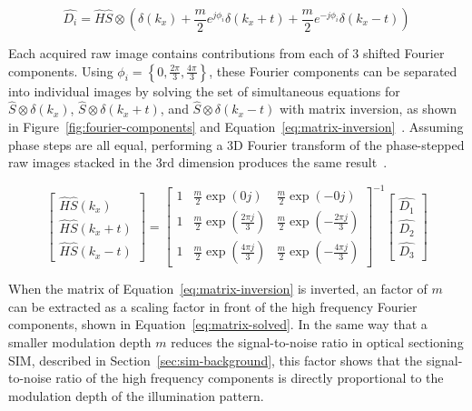\begin{equation} \label{eq:heintzmann-fourier}
\hat{D_i} = \hat{H} \hat{S} \otimes \left( \delta \left( k_x \right) + \frac{m}{2} e^{j\phi_i} \delta \left( k_x + t \right) + \frac{m}{2} e^{-j\phi_i} \delta \left( k_x - t \right) \right)
\end{equation}

Each acquired raw image contains contributions from each of 3 shifted Fourier components.
Using $\phi_i = \left\lbrace0, \frac{2\pi}{3}, \frac{4\pi}{3}\right\rbrace$, these Fourier components can be separated into individual images by solving the set of simultaneous equations for $\hat{S}\otimes\delta \left( k_x \right)$, $\hat{S}\otimes\delta \left( k_x + t \right)$, and $\hat{S}\otimes\delta \left( k_x - t \right)$ with matrix inversion, as shown in Figure~\ref{fig:fourier-components} and Equation~\ref{eq:matrix-inversion}~\cite{wicker2013phase}.
Assuming phase steps are all equal, performing a 3D Fourier transform of the phase-stepped raw images stacked in the 3rd dimension produces the same result~\cite{gustafsson2005nonlinear}.

\begin{equation} \label{eq:matrix-inversion}
\begin{bmatrix} \hat{H}\hat{S}\left(k_x\right) \\ \hat{H}\hat{S}\left(k_x+t\right) \\ \hat{H}\hat{S}\left(k_x-t\right) \end{bmatrix} =
\begin{bmatrix}
1 & \frac{m}{2}\exp\left(0j\right) & \frac{m}{2}\exp\left(-0j\right) \\
1 & \frac{m}{2}\exp\left(\frac{2\pi j}{3}\right) & \frac{m}{2}\exp\left(-\frac{2\pi j}{3}\right) \\
1 & \frac{m}{2}\exp\left(\frac{4\pi j}{3}\right) & \frac{m}{2}\exp\left(-\frac{4\pi j}{3}\right)
\end{bmatrix}^{-1}
\begin{bmatrix} \hat{D_1} \\ \hat{D_2} \\ \hat{D_3} \end{bmatrix}
\end{equation}

\newpage
When the matrix of Equation~\ref{eq:matrix-inversion} is inverted, an factor of $m$ can be extracted as a scaling factor in front of the high frequency Fourier components, shown in Equation~\ref{eq:matrix-solved}.
In the same way that a smaller modulation depth $m$ reduces the signal-to-noise ratio in optical sectioning SIM, described in Section~\ref{sec:sim-background}, this factor shows that the signal-to-noise ratio of the high frequency components is directly proportional to the modulation depth of the illumination pattern.

